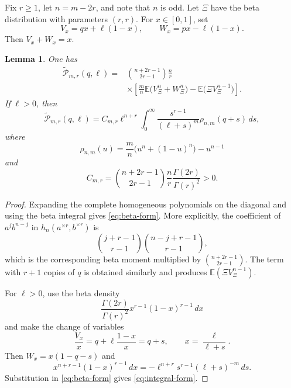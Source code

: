 \documentclass[11pt]{article}
\numberwithin{equation}{section}
\newtheorem{lemma}[theorem]{Lemma}
\newcommand{\E}{\mathbb E}
\newcommand{\wtP}{\widetilde{\mathcal P}}
\begin{document}
Fix $r\ge1$, let $n=m-2r$, and note that $n$ is odd. Let $\Xi$ have the beta distribution with parameters $(r,r)$. For $x\in[0,1]$, set
\begin{equation}\label{eq:VW}
        V_x=qx+\ell(1-x),
        \qquad
        W_x=px-\ell(1-x).
\end{equation}
Then $V_x+W_x=x$.

\begin{lemma}\label{lem:beta-form}
One has
\begin{equation}\label{eq:beta-form}
\begin{aligned}
 \wtP_{m,r}(q,\ell)
 ={}&\binom{n+2r-1}{2r-1}\frac nr\\
 &\times\left[
 \frac mn\E\bigl(V_\Xi^n+W_\Xi^n\bigr)
 -\E\bigl(\Xi V_\Xi^{n-1}\bigr)
 \right].
\end{aligned}
\end{equation}
If $\ell>0$, then
\begin{equation}\label{eq:integral-form}
 \wtP_{m,r}(q,\ell)
 =C_{m,r}\ell^{n+r}
 \int_0^\infty
 \frac{s^{r-1}}{(\ell+s)^m}\rho_{n,m}(q+s)\,ds,
\end{equation}
where
\begin{equation}\label{eq:rho-def}
        \rho_{n,m}(u)=\frac mn\bigl(u^n+(1-u)^n\bigr)-u^{n-1}
\end{equation}
and
\[
        C_{m,r}=\binom{n+2r-1}{2r-1}\frac nr
        \frac{\Gamma(2r)}{\Gamma(r)^2}>0.
\]
\end{lemma}

\begin{proof}
Expanding the complete homogeneous polynomials on the diagonal and using the beta integral gives \eqref{eq:beta-form}. More explicitly, the coefficient of $a^jb^{n-j}$ in $h_n(a^{\times r},b^{\times r})$ is
\[
        \binom{j+r-1}{r-1}\binom{n-j+r-1}{r-1},
\]
which is the corresponding beta moment multiplied by $\binom{n+2r-1}{2r-1}$. The term with $r+1$ copies of $q$ is obtained similarly and produces $\E(\Xi V_\Xi^{n-1})$.

For $\ell>0$, use the beta density
\[
        \frac{\Gamma(2r)}{\Gamma(r)^2}x^{r-1}(1-x)^{r-1}\,dx
\]
and make the change of variables
\[
        \frac{V_x}{x}=q+\ell\frac{1-x}{x}=q+s,
        \qquad x=\frac{\ell}{\ell+s}.
\]
Then $W_x=x(1-q-s)$ and
\[
 x^{n+r-1}(1-x)^{r-1}\,dx
 =-\ell^{n+r}s^{r-1}(\ell+s)^{-m}\,ds.
\]
Substitution in \eqref{eq:beta-form} gives \eqref{eq:integral-form}.
\end{proof}
\end{document}
